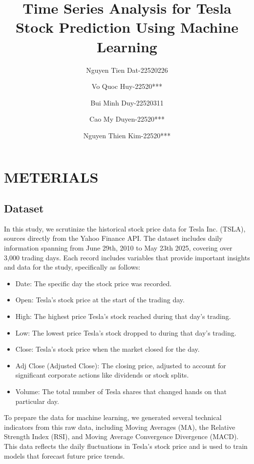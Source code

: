 \documentclass[12pt]{article}
\begin{document}
\title{Time Series Analysis for Tesla Stock Prediction Using Machine Learning}

\author{Nguyen Tien Dat-22520226 
\and Vo Quoc Huy-22520***
\and Bui Minh Duy-22520311
\and Cao My Duyen-22520***
\and Nguyen Thien Kim-22520***}
\maketitle



\section{METERIALS}\label{sec:intro}
\subsection{Dataset}
In this study, we scrutinize the historical stock price data for Tesla Inc. (TSLA), sources directly from the Yahoo Finance API. The dataset includes daily information spanning from June 29th, 2010 to May 23th 2025, covering over 3,000 trading days. Each record includes variables that provide important insights and data for the study, specifically as follows:
\begin{itemize}
    \item Date: The specific day the stock price was recorded.
    \item Open: Tesla's stock price at the start of the trading day.
    \item High: The highest price Tesla's stock reached during that day's trading.
    \item Low: The lowest price Tesla's stock dropped to during that day's trading.
    \item Close: Tesla's stock price when the market closed for the day.
    \item Adj Close (Adjusted Close): The closing price, adjusted to account for significant corporate actions like dividends or stock splits.
    \item Volume: The total number of Tesla shares that changed hands on that particular day.
\end{itemize}
To prepare the data for machine learning, we generated several technical indicators from this raw data, including Moving Averages (MA), the Relative Strength Index (RSI), and Moving Average Convergence Divergence (MACD). This data reflects the daily fluctuations in Tesla's stock price and is used to train models that forecast future price trends.
\end{document}
